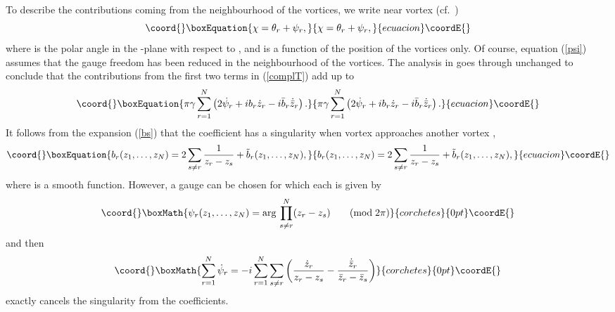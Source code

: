 \documentclass[a4paper,11pt]{article}
\begin{document}
To describe the contributions coming from the neighbourhood of the 
vortices, we write near vortex \coordHE{} (cf.~\cite{Mfovd})
\begin{equation}\coord{}\boxEquation{ \label{psi}
\chi=\theta_{r}+\psi_{r}, 
}{ \chi=\theta_{r}+\psi_{r}, 
}{ecuacion}\coordE{}\end{equation}
where \coordHE{} is the polar angle in the \coordHE{}-plane with respect to
\coordHE{}, and \coordHE{} is a function of the position of the 
vortices only.
Of course, equation (\ref{psi}) assumes that the gauge freedom has 
been reduced in the neighbourhood of the vortices.
The analysis in \cite{Mfovd} goes through unchanged to conclude that
the contributions from the first two terms in (\ref{complT}) add up to
\begin{equation}\coord{}\boxEquation{\label{cont12}
\pi\gamma\sum_{r=1}^{N}\left(2\dot{\psi}_{r}+ib_{r}\dot{z}_{r}
-i\bar{b}_{r}\dot{\bar{z}}_{r}
\right).
}{\pi\gamma\sum_{r=1}^{N}\left(2\dot{\psi}_{r}+ib_{r}\dot{z}_{r}
-i\bar{b}_{r}\dot{\bar{z}}_{r}
\right).
}{ecuacion}\coordE{}\end{equation}
It follows from the expansion (\ref{bs}) that the coefficient \coordHE{} 
has a singularity when vortex \coordHE{} approaches another vortex \coordHE{},
\begin{equation}\coord{}\boxEquation{\label{btil}
b_{r}(z_{1},\ldots,z_{N})=2\sum_{s\ne r}\frac{1}{z_{r}-z_{s}}+
\tilde{b}_{r}(z_{1},\ldots, z_{N}),
}{b_{r}(z_{1},\ldots,z_{N})=2\sum_{s\ne r}\frac{1}{z_{r}-z_{s}}+
\tilde{b}_{r}(z_{1},\ldots, z_{N}),
}{ecuacion}\coordE{}\end{equation}
where \coordHE{} is a smooth function.
However, a gauge can be chosen for which each \coordHE{} is given by
\[\coord{}\boxMath{
\psi_{r}(z_{1},\ldots,z_{N})={\rm arg}\,\prod_{s\ne r}^{N}(z_{r}-z_{s})
\;\;\;\;\;\;\;({\rm mod}\; 2\pi)
}{corchetes}{0pt}\coordE{}\]
and then
\[\coord{}\boxMath{
\sum_{r=1}^{N}\dot{\psi}_{r}=-i
\sum_{r=1}^{N}\sum_{s\ne r}\left( \frac{\dot{z}_{r}}{z_{r}-z_{s}}-
\frac{\dot{\bar{z}}_{r}}{\bar{z}_{r}-\bar{z}_{s}}\right)
}{corchetes}{0pt}\coordE{}\]
exactly cancels the singularity from the \coordHE{} coefficients. 
\end{document}
